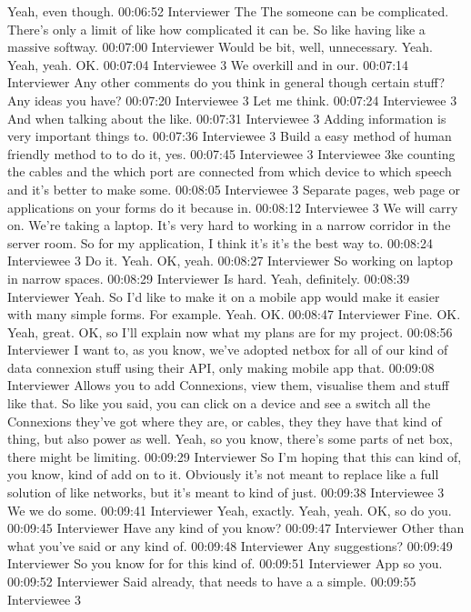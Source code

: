 Yeah, even though.
00:06:52 Interviewer
The The someone can be complicated. There's only a limit of like how complicated it can be. So like having like a massive softway.
00:07:00 Interviewer
Would be bit, well, unnecessary. Yeah. Yeah, yeah. OK.
00:07:04 Interviewee 3
We overkill and in our.
00:07:14 Interviewer
Any other comments do you think in general though certain stuff? Any ideas you have?
00:07:20 Interviewee 3
Let me think.
00:07:24 Interviewee 3
And when talking about the like.
00:07:31 Interviewee 3
Adding information is very important things to.
00:07:36 Interviewee 3
Build a easy method of human friendly method to to do it, yes.
00:07:45 Interviewee 3
Interviewee 3ke counting the cables and the which port are connected from which device to which speech and it's better to make some.
00:08:05 Interviewee 3
Separate pages, web page or applications on your forms do it because in.
00:08:12 Interviewee 3
We will carry on. We're taking a laptop. It's very hard to working in a narrow corridor in the server room. So for my application, I think it's it's the best way to.
00:08:24 Interviewee 3
Do it. Yeah. OK, yeah.
00:08:27 Interviewer
So working on laptop in narrow spaces.
00:08:29 Interviewer
Is hard. Yeah, definitely.
00:08:39 Interviewer
Yeah. So I'd like to make it on a mobile app would make it easier with many simple forms. For example. Yeah. OK.
00:08:47 Interviewer
Fine. OK. Yeah, great. OK, so I'll explain now what my plans are for my project.
00:08:56 Interviewer
I want to, as you know, we've adopted netbox for all of our kind of data connexion stuff using their API, only making mobile app that.
00:09:08 Interviewer
Allows you to add Connexions, view them, visualise them and stuff like that. So like you said, you can click on a device and see a switch all the Connexions they've got where they are, or cables, they they have that kind of thing, but also power as well. Yeah, so you know, there's some parts of net box, there might be limiting.
00:09:29 Interviewer
So I'm hoping that this can kind of, you know, kind of add on to it. Obviously it's not meant to replace like a full solution of like networks, but it's meant to kind of just.
00:09:38 Interviewee 3
We we do some.
00:09:41 Interviewer
Yeah, exactly. Yeah, yeah. OK, so do you.
00:09:45 Interviewer
Have any kind of you know?
00:09:47 Interviewer
Other than what you've said or any kind of.
00:09:48 Interviewer
Any suggestions?
00:09:49 Interviewer
So you know for for this kind of.
00:09:51 Interviewer
App so you.
00:09:52 Interviewer
Said already, that needs to have a a simple.
00:09:55 Interviewee 3
